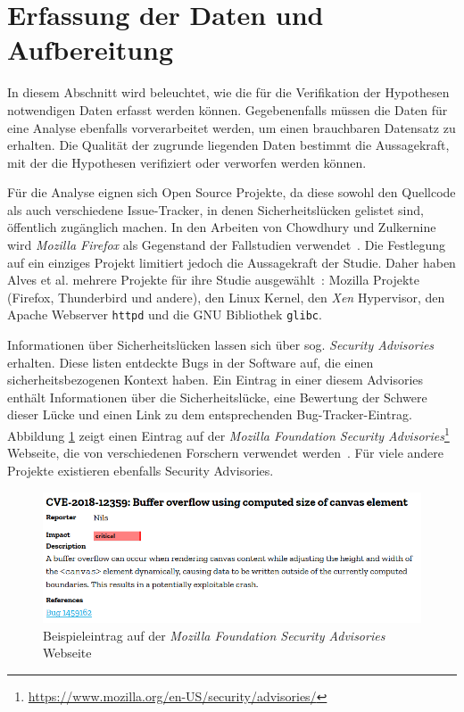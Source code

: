 \section{Erfassung der Daten und Aufbereitung}
\label{sec:erfassung}
In diesem Abschnitt wird beleuchtet, wie die für die Verifikation der Hypothesen notwendigen Daten erfasst werden können.
Gegebenenfalls müssen die Daten für eine Analyse ebenfalls vorverarbeitet werden, um einen brauchbaren Datensatz zu erhalten.
Die Qualität der zugrunde liegenden Daten bestimmt die Aussagekraft, mit der die Hypothesen verifiziert oder verworfen werden können.

Für die Analyse eignen sich Open Source Projekte,
da diese sowohl den Quellcode als auch verschiedene Issue-Tracker,
in denen Sicherheitslücken gelistet sind,
öffentlich zugänglich machen.
In den Arbeiten von Chowdhury und Zulkernine wird \emph{Mozilla Firefox} als Gegenstand der Fallstudien verwendet~\cite{chowdhury_zulkernine_2010,chowdhury_zulkernine_2009}.
Die Festlegung auf ein einziges Projekt limitiert jedoch die Aussagekraft der Studie.
Daher haben Alves et al. mehrere Projekte für ihre Studie ausgewählt~\cite{alves_et_al}: 
Mozilla Projekte (Firefox, Thunderbird und andere),
den Linux Kernel,
den \emph{Xen} Hypervisor,
den Apache Webserver \texttt{httpd} und
die GNU Bibliothek \texttt{glibc}.

Informationen über Sicherheitslücken lassen sich über sog. \emph{Security Advisories} erhalten.
Diese listen entdeckte Bugs in der Software auf, die einen sicherheitsbezogenen Kontext haben.
Ein Eintrag in einer diesem Advisories enthält Informationen über die Sicherheitslücke, eine Bewertung der Schwere dieser Lücke und einen Link zu dem entsprechenden Bug-Tracker-Eintrag.
Abbildung \ref{fig:mfsa} zeigt einen Eintrag auf der \textit{Mozilla Foundation Security Advisories}\footnote{\url{https://www.mozilla.org/en-US/security/advisories/}} Webseite, die von verschiedenen Forschern verwendet werden~\cite{alves_et_al,chowdhury_zulkernine_2010}.
Für viele andere Projekte existieren ebenfalls Security Advisories.
\begin{figure}
	\includegraphics[width=\textwidth]{img/mfsa_example.png}
	\caption{Beispieleintrag auf der \textit{Mozilla Foundation Security Advisories} Webseite}
	\label{fig:mfsa}
\end{figure}

